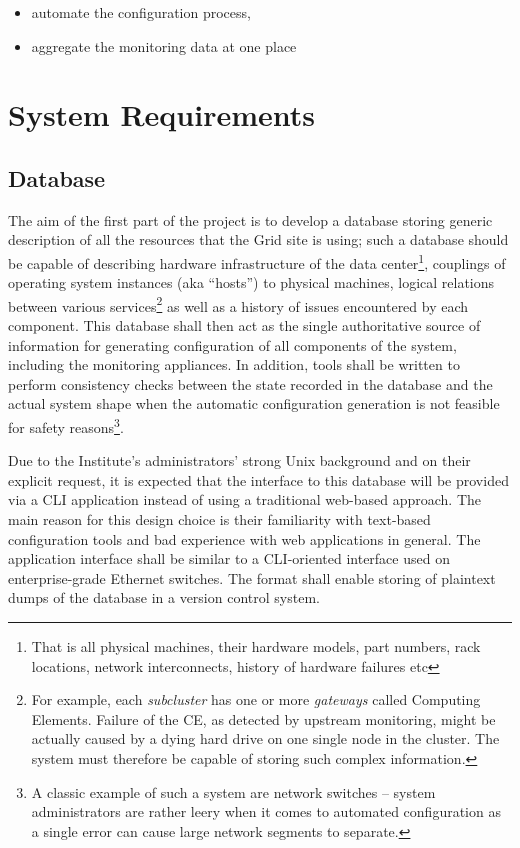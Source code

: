 \documentclass{article}
\begin{document}
\begin{itemize}
    \item{automate the configuration process,}
    \item{aggregate the monitoring data at one place}
\end{itemize}

\section{System Requirements}

\subsection{Database}

The aim of the first part of the project is to develop a database storing generic description of all the resources that the Grid
site is using; such a database should be capable of describing hardware infrastructure of the data center\footnote{That is all
physical machines, their hardware models, part numbers, rack locations, network interconnects, history of hardware failures etc},
couplings of operating system instances (aka ``hosts'') to physical machines, logical relations between various
services\footnote{For example, each {\em subcluster} has one or more {\em gateways} called Computing Elements.  Failure of the CE,
as detected by upstream monitoring, might be actually caused by a dying hard drive on one single node in the cluster.  The system
must therefore be capable of storing such complex information.} as well as a history of issues encountered by each component.
This database shall then act as the single authoritative source of information for generating configuration of all components of
the system, including the monitoring appliances.  In addition, tools shall be written to perform consistency checks between the
state recorded in the database and the actual system shape when the automatic configuration generation is not feasible for safety
reasons\footnote{A classic example of such a system are network switches -- system administrators are rather leery when it comes
to automated configuration as a single error can cause large network segments to separate.}.

Due to the Institute's administrators' strong Unix background and on their explicit request, it is expected that the interface to
this database will be provided via a CLI application instead of using a traditional web-based approach.  The main reason for this
design choice is their familiarity with text-based configuration tools and bad experience with web applications in general.  The
application interface shall be similar to a CLI-oriented interface used on enterprise-grade Ethernet switches.  The format shall
enable storing of plaintext dumps of the database in a version control system.
\end{document}
